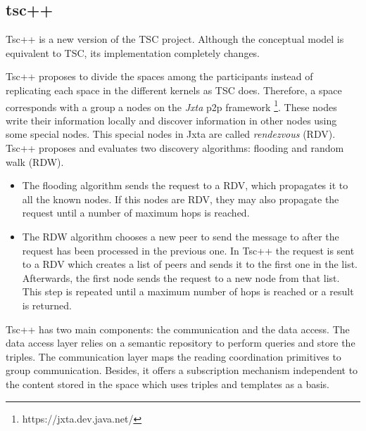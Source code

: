 \subsection{tsc++}

Tsc++ \citep{krummenacher_open_2009,blunder_distributed_2009} is a new version of the TSC project.
Although the conceptual model is equivalent to TSC, its implementation completely changes.


Tsc++ proposes to divide the spaces among the participants instead of replicating each space in the different kernels as TSC does.
Therefore, a space corresponds with a group a nodes on the \emph{Jxta} \ac{p2p} framework \footnote{https://jxta.dev.java.net/}. %
These nodes write their information locally and discover information in other nodes using some special nodes.
This special nodes in Jxta are called \emph{rendezvous} (RDV).
Tsc++ proposes and evaluates two discovery algorithms: flooding and random walk (RDW).
\begin{itemize}
  \item The flooding algorithm sends the request to a RDV, which propagates it to all the known nodes.
	If this nodes are RDV, they may also propagate the request until a number of maximum hops is reached.
  \item The RDW algorithm chooses a new peer to send the message to after the request has been processed in the previous one.
	In Tsc++ the request is sent to a RDV which creates a list of peers and sends it to the first one in the list.
	Afterwards, the first node sends the request to a new node from that list.
	This step is repeated until a maximum number of hops is reached or a result is returned.
\end{itemize}


Tsc++ has two main components: the communication and the data access.
The data access layer relies on a semantic repository to perform queries and store the triples.
The communication layer maps the reading coordination primitives to group communication.
Besides, it offers a subscription mechanism independent to the content stored in the space which uses triples and templates as a basis.



